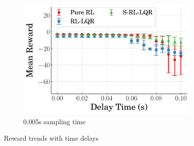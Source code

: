 \begin{figure}[tb]
\begin{subfigure}[b]{0.49\textwidth}
      \centering
      \includegraphics[width=\textwidth]{figures/figures_robustness/invpend_robustness/delay_reward_0.005_sampling.pdf}
      \caption{0.005\si{\second} sampling time}
      \label{subfig_chap4:invpend_delay_reward_0.005}
  \end{subfigure}
  \caption{Reward trends with time delays}
  \label{fig_chap4:invpend_delay_reward}
\end{figure}
%

